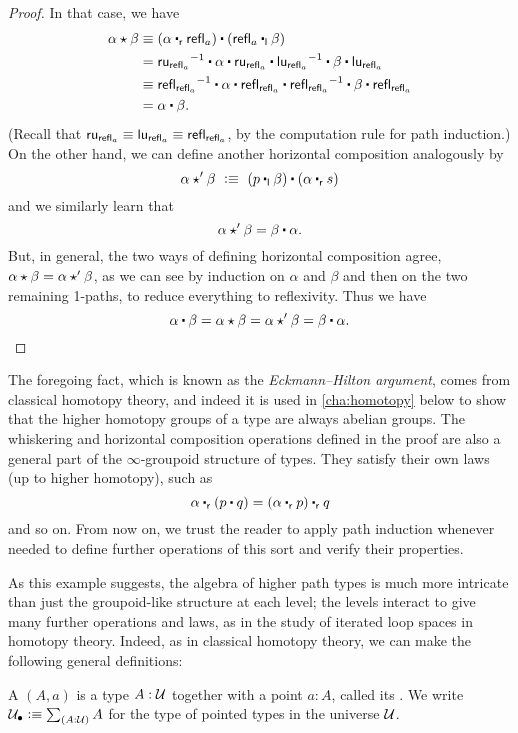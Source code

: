 \begin{proof}
In that case, we have
\begin{align*}
  \alpha\hct\beta
  &\jdeq (\alpha\rightwhisker\refl{a}) \ct (\refl{a}\leftwhisker \beta)\\
  &= \opp{\mathsf{ru}_{\refl{a}}} \ct \alpha \ct \mathsf{ru}_{\refl{a}} \ct \opp{\mathsf{lu}_{\refl a}} \ct \beta \ct \mathsf{lu}_{\refl{a}}\\
  &\jdeq \opp{\refl{\refl{a}}} \ct \alpha \ct \refl{\refl{a}} \ct \opp{\refl{\refl a}} \ct \beta \ct \refl{\refl{a}}\\
  &= \alpha \ct \beta.
\end{align*}
(Recall that $\mathsf{ru}_{\mathsf{refl}_{a}} \equiv \mathsf{lu}_{\mathsf{refl}_{a}} \equiv \mathsf{refl}_{\mathsf{refl}_{a}}$, by the computation rule for path induction.)
On the other hand, we can define another horizontal composition analogously by
\[
\alpha\hct'\beta\ \defeq\ (p\leftwhisker \beta)\ct (\alpha\rightwhisker s)
\]
and we similarly learn that
\[
\alpha\hct'\beta = \beta\ct\alpha.
\]
%
But, in general, the two ways of defining horizontal composition agree, $\alpha\star\beta = \alpha\star'\beta$, as we can see by induction on $\alpha$ and $\beta$ and then on the two remaining 1-paths, to reduce everything to reflexivity.
Thus we have
\[\alpha \ct \beta = \alpha\hct\beta = \alpha\hct'\beta = \beta\ct\alpha.
\qedhere
\]
\end{proof}

The foregoing fact, which is known as the \emph{Eckmann--Hilton argument}, comes from classical homotopy theory, and indeed it is used in \cref{cha:homotopy} below to show that the higher homotopy groups of a type are always abelian groups.
The whiskering and horizontal composition operations defined in the proof are also a general part of the $\infty$-groupoid structure of types.
They satisfy their own laws (up to higher homotopy), such as
\[ \alpha \rightwhisker (p\ct q) = (\alpha \rightwhisker p) \rightwhisker q \]
and so on.
From now on, we trust the reader to apply path induction whenever needed to define further operations of this sort and verify their properties.

As this example suggests, the algebra of higher path types is much more intricate than just the groupoid-like structure at each level; the levels interact to give many further operations and laws, as in the study of iterated loop spaces in homotopy theory.
Indeed, as in classical homotopy theory, we can make the following general definitions:

\begin{defn} \label{def:pointedtype}
  A 
  $(A,a)$ is a type $A:\mathcal{U}$ together with a point $a:A$, called its .
  We write $\pointed{\type} \defeq \sm{A:\type} A$ for the type of pointed types in the universe $\mathcal{U}$.
\end{defn}

